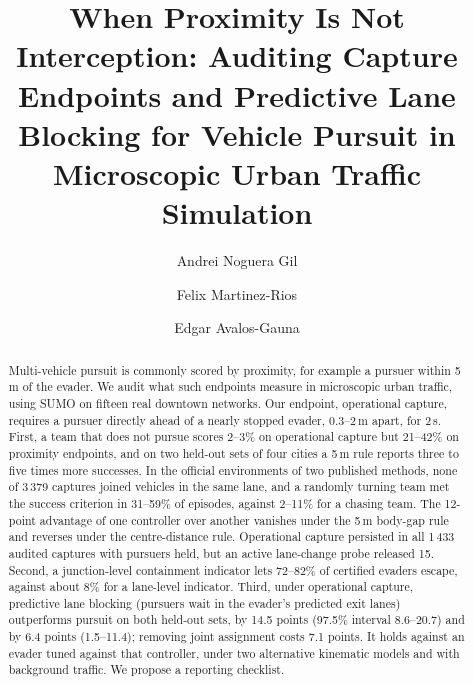 \documentclass[5p,twocolumn]{elsarticle}
\begin{document}
\begin{frontmatter}

\title{When Proximity Is Not Interception: Auditing Capture Endpoints and Predictive Lane Blocking for Vehicle Pursuit in Microscopic Urban Traffic Simulation}

\author[1]{Andrei Noguera Gil}
\author[1]{Felix Martinez-Rios}
\author[2]{Edgar Avalos-Gauna}



\begin{abstract}
Multi-vehicle pursuit is commonly scored by proximity, for example a pursuer within 5\,m of the evader. We audit what
such endpoints measure in microscopic urban traffic, using SUMO on fifteen real downtown networks. Our
endpoint, operational capture, requires a pursuer directly ahead of a nearly stopped evader, 0.3--2\,m apart, for
2\,s. First, a team that does not pursue scores 2--3\% on operational capture but 21--42\% on proximity endpoints,
and on two held-out sets of four cities a 5\,m rule reports three to five times more successes. In the official
environments of two published methods, none of 3\,379 captures joined vehicles in the same lane, and a randomly
turning team met the success criterion in 31--59\% of episodes, against 2--11\% for a chasing team. The 12-point
advantage of one controller over another vanishes under the 5\,m body-gap rule and reverses under the
centre-distance rule. Operational capture persisted in all 1\,433 audited captures with pursuers held, but an active
lane-change probe released 15. Second, a junction-level containment indicator lets 72--82\% of certified evaders
escape, against about 8\% for a lane-level indicator. Third, under operational capture, predictive lane blocking
(pursuers wait in the evader's predicted exit lanes) outperforms pursuit on both held-out sets, by 14.5 points
(97.5\% interval 8.6--20.7) and by 6.4 points (1.5--11.4); removing joint assignment costs 7.1 points. It
holds against an evader tuned against that controller, under two alternative kinematic models and with
background traffic. We propose a reporting checklist.
\end{abstract}


\end{frontmatter}
\end{document}
